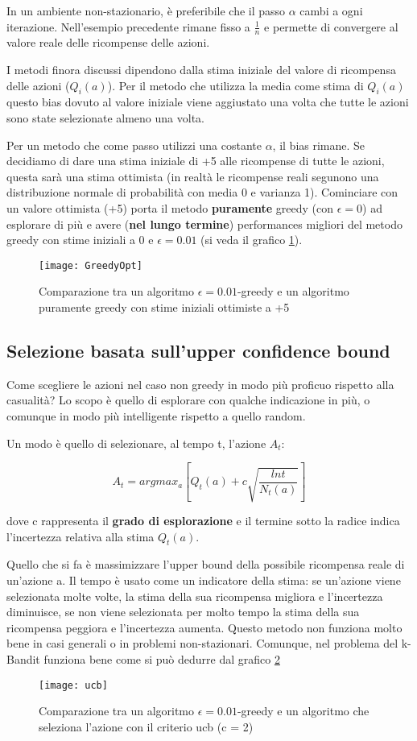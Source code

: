 In un ambiente non-stazionario, è preferibile che il passo $\alpha$ cambi a ogni
iterazione. Nell'esempio precedente rimane fisso a $\frac{1}{n}$ e permette di convergere
al valore reale delle ricompense delle azioni.

I metodi finora discussi dipendono dalla stima iniziale del valore di
ricompensa delle azioni ($Q_i(a)$).
Per il metodo che utilizza la media come stima di $Q_i(a)$ questo bias
dovuto al valore iniziale viene aggiustato una volta che tutte le azioni
sono state selezionate almeno una volta.

Per un metodo che come passo utilizzi una costante $\alpha$, il bias rimane.
Se decidiamo di dare una stima iniziale di +5 alle ricompense di tutte le
azioni, questa sarà una stima ottimista (in realtà le ricompense reali
segunono una distribuzione normale di probabilità con media 0 e varianza 1).
Cominciare con un valore ottimista (+5) porta il metodo \textbf{puramente}
greedy (con $\epsilon = 0$) ad esplorare di più e avere (\textbf{nel lungo termine})
performances migliori del metodo greedy con stime iniziali a 0 e $\epsilon = 0.01$
(si veda il grafico \ref{fig:greedyOpt}).

\begin{figure}[H]
\centering
\texttt{[image: GreedyOpt]}
\caption{Comparazione tra un algoritmo $\epsilon = 0.01$-greedy e un algoritmo
puramente greedy con stime iniziali ottimiste a +5}
\label{fig:greedyOpt}
\end{figure}

\subsection{Selezione basata sull'upper confidence bound}

Come scegliere le azioni nel caso non greedy in modo più proficuo
rispetto alla casualità? Lo scopo è quello di esplorare con qualche indicazione
in più, o comunque in modo più intelligente rispetto a quello random.

Un modo è quello di selezionare, al tempo t, l'azione $A_t$:

\begin{equation}
A_t = argmax_a [Q_t(a) + c \sqrt{\frac{ln t}{N_t(a)}}]
\end{equation}

dove c rappresenta il \textbf{grado di esplorazione} e il termine
sotto la radice indica l'incertezza relativa alla stima $Q_t(a)$.

Quello che si fa è massimizzare l'upper bound della possibile
ricompensa reale di un'azione a. Il tempo è usato come un
indicatore della stima: se un'azione viene selezionata molte volte,
la stima della sua ricompensa migliora e l'incertezza diminuisce,
se non viene selezionata per molto tempo la stima della sua
ricompensa peggiora e l'incertezza aumenta.
Questo metodo non funziona molto bene in casi generali o in problemi
non-stazionari. Comunque, nel problema del k-Bandit funziona bene
come si può dedurre dal grafico \ref{fig:ucb}

\begin{figure}[H]
\centering
\texttt{[image: ucb]}
\caption{Comparazione tra un algoritmo $\epsilon = 0.01$-greedy e un algoritmo
che seleziona l'azione con il criterio ucb (c = 2)}
\label{fig:ucb}
\end{figure}




